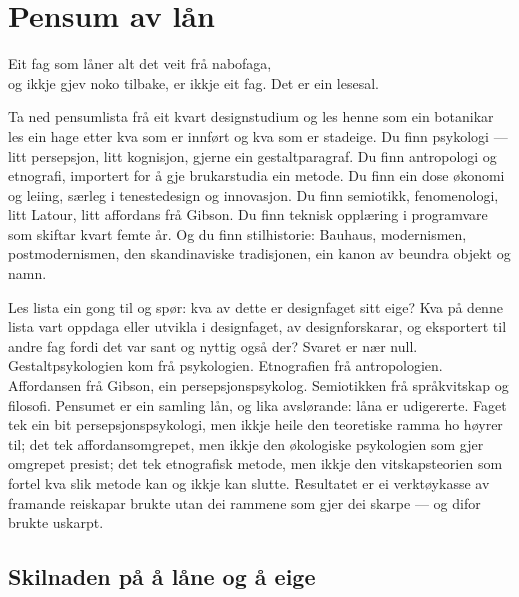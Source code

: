 \chapter{Pensum av lån}

\begin{motto}
Eit fag som låner alt det veit frå nabofaga,\\ og ikkje gjev noko tilbake, er ikkje eit fag. Det er ein lesesal.
\end{motto}

Ta ned pensumlista frå eit kvart designstudium og les henne som ein botanikar les ein hage etter kva som er innført og kva som er stadeige. Du finn psykologi — litt persepsjon, litt kognisjon, gjerne ein gestaltparagraf. Du finn antropologi og etnografi, importert for å gje brukarstudia ein metode. Du finn ein dose økonomi og leiing, særleg i tenestedesign og innovasjon. Du finn semiotikk, fenomenologi, litt Latour, litt affordans frå Gibson. Du finn teknisk opplæring i programvare som skiftar kvart femte år. Og du finn stilhistorie: Bauhaus, modernismen, postmodernismen, den skandinaviske tradisjonen, ein kanon av beundra objekt og namn.

Les lista ein gong til og spør: kva av dette er designfaget sitt eige? Kva på denne lista vart oppdaga eller utvikla i designfaget, av designforskarar, og eksportert til andre fag fordi det var sant og nyttig også der? Svaret er nær null. Gestaltpsykologien kom frå psykologien. Etnografien frå antropologien. Affordansen frå Gibson, ein persepsjonspsykolog. Semiotikken frå språkvitskap og filosofi. Pensumet er ein samling lån, og lika avslørande: låna er udigererte. Faget tek ein bit persepsjonspsykologi, men ikkje heile den teoretiske ramma ho høyrer til; det tek affordansomgrepet, men ikkje den økologiske psykologien som gjer omgrepet presist; det tek etnografisk metode, men ikkje den vitskapsteorien som fortel kva slik metode kan og ikkje kan slutte. Resultatet er ei verktøykasse av framande reiskapar brukte utan dei rammene som gjer dei skarpe — og difor brukte uskarpt.

\section{Skilnaden på å låne og å eige}

